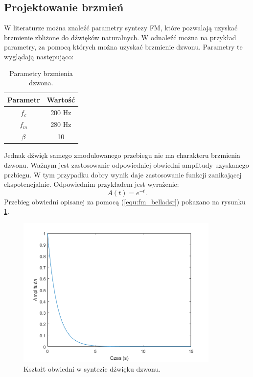 \subsection{Projektowanie brzmień}
W literaturze można znaleźć parametry syntezy FM, które pozwalają uzyskać brzmienie zbliżone do dźwięków naturalnych. W \cite{chowning} odnaleźć można na przykład parametry, za pomocą których można uzyskać brzmienie dzwonu. Parametry te wyglądają następująco:

\begin{table}[h!]
\centering
	\begin{tabular}{ |c| c| }
	\hline
	Parametr & Wartość \\
	\hline
	$f_c$ & 200 Hz \\
	\hline
	$f_m$ & 280 Hz\\
	\hline
	$\beta$ & 10\\
	\hline
	
	\end{tabular}
\captionsetup{justification=centering}
\label{tab:fm_bell}
\caption{Parametry brzmienia dzwona.}
\end{table}
Jednak dźwięk samego zmodulowanego przebiegu nie ma charakteru brzmienia dzwonu. Ważnym jest zastosowanie odpowiedniej obwiedni amplitudy uzyskanego przbiegu. W tym przypadku dobry wynik daje zastosowanie funkcji zanikającej ekspotencjalnie. Odpowiednim przykładem jest wyrażenie:
\begin{equation} \label{equ:fm_belladsr}
A(t) = e^{-t}.
\end{equation}
Przebieg obwiedni opisanej za pomocą (\ref{equ:fm_belladsr}) pokazano na rysunku \ref{rys:fm_belladsr}.
\begin{figure}[H]
	\centering
	\includegraphics[width=10cm]{grafiki/fm_belladsr}
	\captionsetup{justification=centering}
	\caption{Kształt obwiedni w syntezie dźwięku dzwonu.}
	\label{rys:fm_belladsr}
\end{figure}

